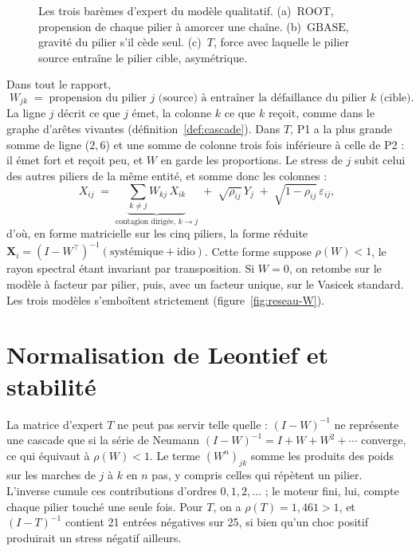 \begin{figure}[H]\centering
{}
\caption{Les trois barèmes d'expert du modèle qualitatif. (a)~$\mathrm{ROOT}$, propension de
chaque pilier à amorcer une chaîne. (b)~$\mathrm{GBASE}$, gravité du pilier s'il cède seul.
(c)~$T$, force avec laquelle le pilier source entraîne le pilier cible, asymétrique.}
\label{fig:baremes}
\end{figure}

Dans tout le rapport,
\[
  \boxed{\;W_{jk}\;=\;\text{propension du pilier } j \text{ (source) à entraîner la
  défaillance du pilier } k \text{ (cible).}\;}
\]
La ligne $j$ décrit ce que $j$ émet, la colonne $k$ ce que $k$ reçoit, comme dans le graphe
d'arêtes vivantes (définition~\ref{def:cascade}). Dans $T$, P1 a la plus grande somme
de ligne ($2{,}6$) et une somme de colonne trois fois inférieure à celle de P2 : il émet fort et
reçoit peu, et $W$ en garde les proportions. Le stress de $j$ subit celui des autres piliers de la même entité, et somme donc les colonnes :
\begin{equation}
X_{ij} \;=\; \underbrace{\sum_{k\neq j} W_{kj}\,X_{ik}}_{\text{contagion dirigée, } k \to j}
   \;+\; \sqrt{\rho_{ij}}\,Y_j \;+\; \sqrt{1-\rho_{ij}}\,\varepsilon_{ij},
\end{equation}
d'où, en forme matricielle sur les cinq piliers, la forme réduite
$\mathbf X_i=(I-W^{\top})^{-1}(\text{systémique}+\text{idio})$. Cette forme suppose
$\rho(W)<1$, le rayon spectral étant invariant par transposition. Si
$W=0$, on retombe sur le modèle à facteur par pilier, puis, avec un facteur unique, sur le Vasicek
standard. Les trois modèles s'emboîtent strictement (figure~\ref{fig:reseau-W}).


\section{Normalisation de Leontief et stabilité}

La matrice d'expert $T$ ne peut pas servir telle quelle : $(I-W)^{-1}$ ne représente
une cascade que si la série de Neumann $(I-W)^{-1}=I+W+W^2+\cdots$ converge, ce qui équivaut à $\rho(W)<1$. Le terme $(W^n)_{jk}$ somme les produits des poids sur les marches de $j$ à $k$ en $n$ pas,
y compris celles qui répètent un pilier. L'inverse cumule ces contributions d'ordres $0,1,2,\dots$ ;
le moteur fini, lui, compte chaque pilier touché une seule fois. Pour $T$,
on a $\rho(T)=1{,}461>1$, et $(I-T)^{-1}$ contient 21 entrées négatives
sur 25, si bien qu'un choc positif produirait un stress négatif ailleurs.

